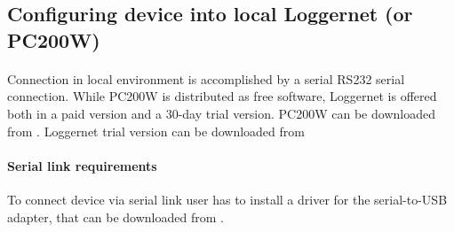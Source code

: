 \subsection{Configuring device into local Loggernet (or PC200W)}
\paragraph{}
Connection in local environment is accomplished by a serial RS232 serial connection. While PC200W is distributed as free software, Loggernet is offered both in a paid version and a 30-day trial version. PC200W can be downloaded from \cite{cs1}. Loggernet trial version can be downloaded from \cite{cs2}
\paragraph{Serial link requirements}
To connect device via serial link user has to install a driver for the serial-to-USB adapter, that can be downloaded from \cite{prol1}. 
